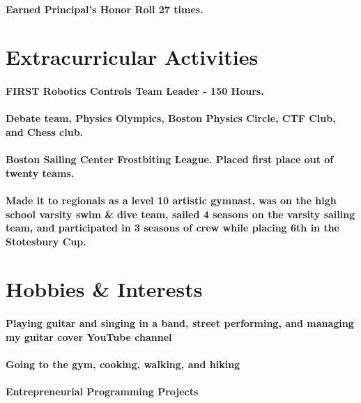 \documentclass{article}
\begin{document}
\paragraph{Earned Principal's Honor Roll 27 times.}

\section{Extracurricular Activities}

\paragraph{FIRST Robotics Controls Team Leader - 150 Hours.}

\paragraph{Debate team, Physics Olympics, Boston Physics Circle, CTF Club, and Chess club.}
\paragraph{Boston Sailing Center Frostbiting League. Placed first place out of twenty teams.}
\paragraph{Made it to regionals as a level 10 artistic gymnast, was on the high school varsity swim \& dive team, sailed 4 seasons on the varsity sailing team, and participated in 3 seasons of crew while placing 6th in the Stotesbury Cup.}


\section{Hobbies \& Interests}

\paragraph{Playing guitar and singing in a band, street performing, and managing my guitar cover YouTube channel}

\paragraph{Going to the gym, cooking, walking, and hiking}

\paragraph{Entrepreneurial Programming Projects}
\end{document}
